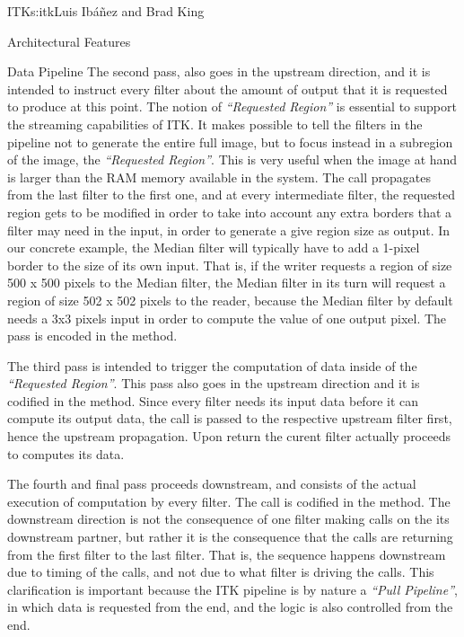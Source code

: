 \begin{aosachapter}{ITK}{s:itk}{Luis Ib\'{a}\~{n}ez and Brad King}
\begin{aosasect1}{Architectural Features}
\begin{aosasect2}{Data Pipeline}
The second pass, also goes in the upstream direction, and it is intended to
instruct every filter about the amount of output that it is requested to
produce at this point. The notion of \emph{``Requested Region''} is essential
to support the streaming capabilities of ITK. It makes possible to tell the
filters in the pipeline not to generate the entire full image, but to focus
instead in a subregion of the image, the \emph{``Requested Region''}. This is
very useful when the image at hand is larger than the RAM memory available in
the system. The call propagates from the last filter to the first one, and at
every intermediate filter, the requested region gets to be modified in order to
take into account any extra borders that a filter may need in the input, in
order to generate a give region size as output. In our concrete example, the
Median filter will typically have to add a 1-pixel border to the size of its
own input. That is, if the writer requests a region of size 500 x 500 pixels to
the Median filter, the Median filter in its turn will request a region of size
502 x 502 pixels to the reader, because the Median filter by default needs a
3x3 pixels input in order to compute the value of one output pixel. The pass is
encoded in the  method.

The third pass is intended to trigger the computation of data inside of the
\emph{``Requested Region''}. This pass also goes in the upstream direction and
it is codified in the  method.  Since every filter
needs its input data before it can compute its output data, the call is passed
to the respective upstream filter first, hence the upstream propagation. Upon
return the curent filter actually proceeds to computes its data.

The fourth and final pass proceeds downstream, and consists of the actual
execution of computation by every filter. The call is codified in the
 method. The downstream direction is not the consequence
of one filter making calls on the its downstream partner, but rather it is the
consequence that the  calls are returning from the
first filter to the last filter. That is, the sequence happens downstream due
to timing of the calls, and not due to what filter is driving the calls. This
clarification is important because the ITK pipeline is by nature a \emph{``Pull
Pipeline''}, in which data is requested from the end, and the logic is also
controlled from the end.

\end{aosasect2}


\end{aosasect1}
\end{aosachapter}
